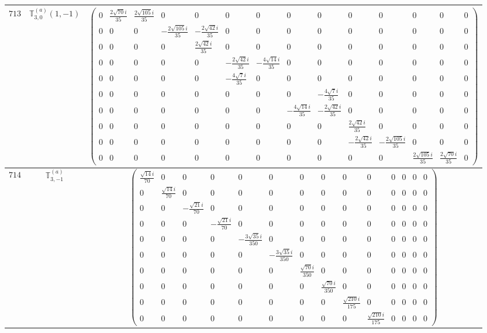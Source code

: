 \documentclass[fleqn,8pt,landscape]{jsarticle}
\begin{document}
\begin{center}
\begin{longtable}{ccc}
$ 713 $ & $ \mathbb{T}_{3,0}^{(a)}(1,-1) $ & $ \begin{pmatrix} 0 & \frac{2 \sqrt{70} i}{35} & \frac{2 \sqrt{105} i}{35} & 0 & 0 & 0 & 0 & 0 & 0 & 0 & 0 & 0 & 0 & 0 \\ 0 & 0 & 0 & - \frac{2 \sqrt{105} i}{35} & - \frac{2 \sqrt{42} i}{35} & 0 & 0 & 0 & 0 & 0 & 0 & 0 & 0 & 0 \\ 0 & 0 & 0 & 0 & \frac{2 \sqrt{42} i}{35} & 0 & 0 & 0 & 0 & 0 & 0 & 0 & 0 & 0 \\ 0 & 0 & 0 & 0 & 0 & - \frac{2 \sqrt{42} i}{35} & - \frac{4 \sqrt{14} i}{35} & 0 & 0 & 0 & 0 & 0 & 0 & 0 \\ 0 & 0 & 0 & 0 & 0 & - \frac{4 \sqrt{7} i}{35} & 0 & 0 & 0 & 0 & 0 & 0 & 0 & 0 \\ 0 & 0 & 0 & 0 & 0 & 0 & 0 & 0 & - \frac{4 \sqrt{7} i}{35} & 0 & 0 & 0 & 0 & 0 \\ 0 & 0 & 0 & 0 & 0 & 0 & 0 & - \frac{4 \sqrt{14} i}{35} & - \frac{2 \sqrt{42} i}{35} & 0 & 0 & 0 & 0 & 0 \\ 0 & 0 & 0 & 0 & 0 & 0 & 0 & 0 & 0 & \frac{2 \sqrt{42} i}{35} & 0 & 0 & 0 & 0 \\ 0 & 0 & 0 & 0 & 0 & 0 & 0 & 0 & 0 & - \frac{2 \sqrt{42} i}{35} & - \frac{2 \sqrt{105} i}{35} & 0 & 0 & 0 \\ 0 & 0 & 0 & 0 & 0 & 0 & 0 & 0 & 0 & 0 & 0 & \frac{2 \sqrt{105} i}{35} & \frac{2 \sqrt{70} i}{35} & 0 \end{pmatrix} $ \\ \hline
$ 714 $ & $ \mathbb{T}_{3,-1}^{(a)} $ & $ \begin{pmatrix} \frac{\sqrt{14} i}{70} & 0 & 0 & 0 & 0 & 0 & 0 & 0 & 0 & 0 & 0 & 0 & 0 & 0 \\ 0 & \frac{\sqrt{14} i}{70} & 0 & 0 & 0 & 0 & 0 & 0 & 0 & 0 & 0 & 0 & 0 & 0 \\ 0 & 0 & - \frac{\sqrt{21} i}{70} & 0 & 0 & 0 & 0 & 0 & 0 & 0 & 0 & 0 & 0 & 0 \\ 0 & 0 & 0 & - \frac{\sqrt{21} i}{70} & 0 & 0 & 0 & 0 & 0 & 0 & 0 & 0 & 0 & 0 \\ 0 & 0 & 0 & 0 & - \frac{3 \sqrt{35} i}{350} & 0 & 0 & 0 & 0 & 0 & 0 & 0 & 0 & 0 \\ 0 & 0 & 0 & 0 & 0 & - \frac{3 \sqrt{35} i}{350} & 0 & 0 & 0 & 0 & 0 & 0 & 0 & 0 \\ 0 & 0 & 0 & 0 & 0 & 0 & \frac{\sqrt{70} i}{350} & 0 & 0 & 0 & 0 & 0 & 0 & 0 \\ 0 & 0 & 0 & 0 & 0 & 0 & 0 & \frac{\sqrt{70} i}{350} & 0 & 0 & 0 & 0 & 0 & 0 \\ 0 & 0 & 0 & 0 & 0 & 0 & 0 & 0 & \frac{\sqrt{210} i}{175} & 0 & 0 & 0 & 0 & 0 \\ 0 & 0 & 0 & 0 & 0 & 0 & 0 & 0 & 0 & \frac{\sqrt{210} i}{175} & 0 & 0 & 0 & 0 \end{pmatrix} $ \\ \hline

\end{longtable}
\end{center}
\end{document}
